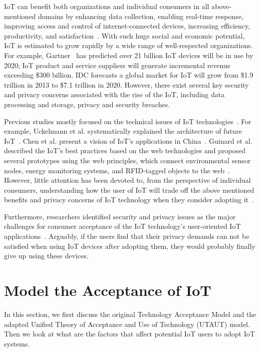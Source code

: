IoT can benefit both organizations and individual consumers in all above-mentioned domains by enhancing data collection, enabling real-time response, improving access and control of internet-connected devices, increasing efficiency, productivity, and satisfaction~\cite{weinberg2015internet, porter2014smart}. With such huge social and economic potential, IoT is estimated to grow rapidly by a wide range of well-respected organizations. For example, Gartner~\cite{eddy2015gartner} has predicted over 21 billion IoT devices will be in use by 2020; IoT product and service suppliers will generate incremental revenue exceeding \$300 billion. IDC forecasts a global market for IoT will grow from \$1.9 trillion in 2013 to \$7.1 trillion in 2020. However, there exist several key security and privacy concerns associated with the rise of the IoT, including data processing and storage, privacy and security breaches\cite{weinberg2015internet, lu2014overview, yu2015handling}.

Previous studies mostly focused on the technical issues of IoT technologies~\cite{fantana2013iot, lazarescu2013design, shang2012internet}. For example, Uckelmann et al. systematically explained the architecture of future IoT~\cite{uckelmann2011architectural}. Chen et al. present a vision of IoT's applications in China~\cite{chen2014vision}. Guinard et al. described the IoT’s best practices based on the web technologies and proposed several prototypes using the web principles, which connect environmental sensor nodes, energy monitoring systems, and RFID-tagged objects to the web~\cite{guinard2011internet}. However, little attention has been devoted to, from the perspective of individual consumers, understanding how the user of IoT will trade off the above mentioned benefits and privacy concerns of IoT technology when they consider adopting it~\cite{al2016modeling, gao2014unified, mital2018adoption}.

Furthermore, researchers identified security and privacy issues as the major challenges for consumer acceptance of the IoT technology’s user-oriented IoT applications~\cite{medaglia2010overview}. Arguably, if the users find that their privacy demands can not be satisfied when using IoT devices after adopting them, they would probably finally give up using these devices.

\section{Model the Acceptance of IoT}
In this section, we first discuss the original Technology Acceptance Model and the adapted Unified Theory of Acceptance and Use of Technology (UTAUT) model. Then we look at what are the factors that affect potential IoT users to adopt IoT systems. 

